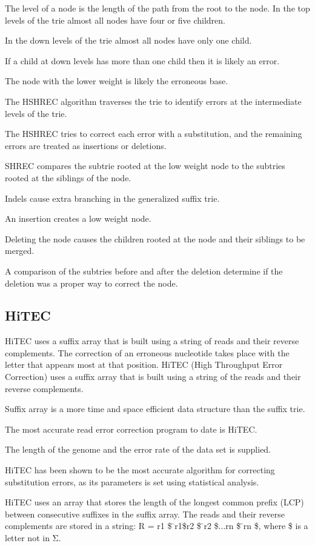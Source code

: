 \documentclass{llncs}
\begin{document}
The level of a node is the length of the path from the root to the node.
In the top levels of the trie almost all nodes have four or five children.

In the down levels of the trie almost all nodes have only one child. 

If a child at down levels has more than one child then it is likely an error. 

The node with the lower weight is likely the erroneous base. 

The HSHREC algorithm traverses the trie to identify errors at the intermediate levels of the trie. 

The HSHREC tries to correct each error with a substitution, and the remaining errors are treated as insertions or deletions.

SHREC compares the subtrie rooted at the low weight node to the subtries rooted at the siblings of the node.

Indels cause extra branching in the generalized suffix trie. 

An insertion creates a low weight node.

Deleting the node causes the children rooted at the node and their siblings to
be merged. 

A comparison of the subtries before and after the deletion determine if the deletion
was a proper way to correct the node. 

\subsection{HiTEC}
HiTEC \cite{HiTec} uses a suffix array that is built using a string of reads and their reverse complements. The correction of an erroneous nucleotide takes place with the letter that appears most at that position.
HiTEC (High Throughput Error Correction) uses a suffix array that is built using a string of the reads and their reverse complements. 

Suffix array is a more time and space efficient data structure than the suffix trie.

The most accurate read error correction program to date is HiTEC.

The length of the genome and the error rate of the data set is supplied. 

HiTEC has been shown to be the most accurate algorithm for correcting substitution errors, as its parameters is set using statistical analysis.

HiTEC uses an array that stores the length of the longest common prefix (LCP) between consecutive suffixes in the suffix array.
The reads and their reverse complements are stored in a string:
R = r1 \$ ̄r1\$r2 \$ ̄r2 \$...rn \$ ̄rn \$, where \$ is a letter not in Σ.
\end{document}
